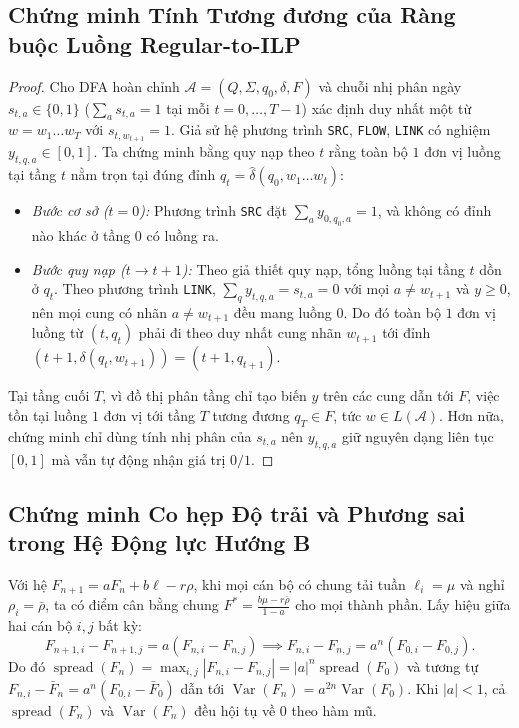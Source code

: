 \subsection{Chứng minh Tính Tương đương của Ràng buộc Luồng Regular-to-ILP}
\label{app:flow_proof}
\begin{proof}
Cho DFA hoàn chỉnh $\mathcal{A} = (Q, \Sigma, q_0, \delta, F)$ và chuỗi nhị phân ngày $s_{t, a} \in \{0, 1\}$ ($\sum_a s_{t, a} = 1$ tại mỗi $t = 0, \dots, T-1$) xác định duy nhất một từ $w = w_1\dots w_T$ với $s_{t, w_{t+1}} = 1$. Giả sử hệ phương trình \texttt{SRC}, \texttt{FLOW}, \texttt{LINK} có nghiệm $y_{t, q, a} \in [0, 1]$. Ta chứng minh bằng quy nạp theo $t$ rằng toàn bộ $1$ đơn vị luồng tại tầng $t$ nằm trọn tại đúng đỉnh $q_t = \hat{\delta}(q_0, w_1\dots w_t)$:
\begin{itemize}
    \item \textit{Bước cơ sở ($t = 0$):} Phương trình \texttt{SRC} đặt $\sum_a y_{0, q_0, a} = 1$, và không có đỉnh nào khác ở tầng $0$ có luồng ra.
    \item \textit{Bước quy nạp ($t \to t+1$):} Theo giả thiết quy nạp, tổng luồng tại tầng $t$ dồn ở $q_t$. Theo phương trình \texttt{LINK}, $\sum_q y_{t, q, a} = s_{t, a} = 0$ với mọi $a \neq w_{t+1}$ và $y \ge 0$, nên mọi cung có nhãn $a \neq w_{t+1}$ đều mang luồng $0$. Do đó toàn bộ $1$ đơn vị luồng từ $(t, q_t)$ phải đi theo duy nhất cung nhãn $w_{t+1}$ tới đỉnh $(t+1, \delta(q_t, w_{t+1})) = (t+1, q_{t+1})$.
\end{itemize}
Tại tầng cuối $T$, vì đồ thị phân tầng chỉ tạo biến $y$ trên các cung dẫn tới $F$, việc tồn tại luồng $1$ đơn vị tới tầng $T$ tương đương $q_T \in F$, tức $w \in L(\mathcal{A})$. Hơn nữa, chứng minh chỉ dùng tính nhị phân của $s_{t,a}$ nên $y_{t,q,a}$ giữ nguyên dạng liên tục $[0,1]$ mà vẫn tự động nhận giá trị $0/1$.
\end{proof}

\subsection{Chứng minh Co hẹp Độ trải và Phương sai trong Hệ Động lực Hướng B}
\label{app:dynamics_proof}
Với hệ $F_{n+1} = a F_n + b \ell - r \rho$, khi mọi cán bộ có chung tải tuần $\ell_i = \mu$ và nghỉ $\rho_i = \bar{\rho}$, ta có điểm cân bằng chung $F^* = \frac{b\mu - r\bar{\rho}}{1-a}$ cho mọi thành phần. Lấy hiệu giữa hai cán bộ $i, j$ bất kỳ:
\begin{equation*}
    F_{n+1, i} - F_{n+1, j} = a(F_{n, i} - F_{n, j}) \implies F_{n, i} - F_{n, j} = a^n (F_{0, i} - F_{0, j}).
\end{equation*}
Do đó $\operatorname{spread}(F_n) = \max_{i,j} |F_{n,i} - F_{n,j}| = |a|^n \operatorname{spread}(F_0)$ và tương tự $F_{n, i} - \bar{F}_n = a^n (F_{0, i} - \bar{F}_0)$ dẫn tới $\operatorname{Var}(F_n) = a^{2n} \operatorname{Var}(F_0)$. Khi $|a| < 1$, cả $\operatorname{spread}(F_n)$ và $\operatorname{Var}(F_n)$ đều hội tụ về $0$ theo hàm mũ.

